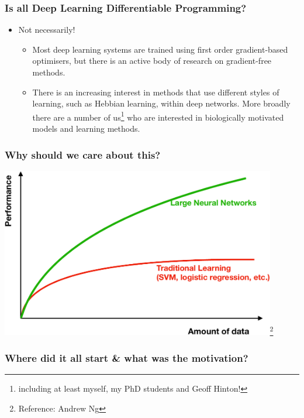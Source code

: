 \documentclass[\beamerclass]{beamer}
\begin{document}
\begin{frame}
\frametitle{Is all Deep Learning Differentiable Programming?}
\begin{itemize}
	\item Not necessarily!
	\begin{itemize}
		\item<+-> Most deep learning systems are trained using first order gradient-based optimisers, but there is an active body of research on gradient-free methods.
		\item<+-> There is an increasing interest in methods that use different styles of learning, such as Hebbian learning, within deep networks. More broadly there are a number of us\footnote{including at least myself, my PhD students and Geoff Hinton!} who are interested in biologically motivated models and learning methods.
	\end{itemize}
\end{itemize}
\end{frame}

\begin{frame}
	\frametitle{Why should we care about this?}
	\includegraphics[width=0.9\textwidth]{Fig1.pdf}\footnote{Reference: Andrew Ng}
\end{frame}

\begin{frame}
	\frametitle{Where did it all start \& what was the motivation?}
	
\end{frame}
\end{document}

